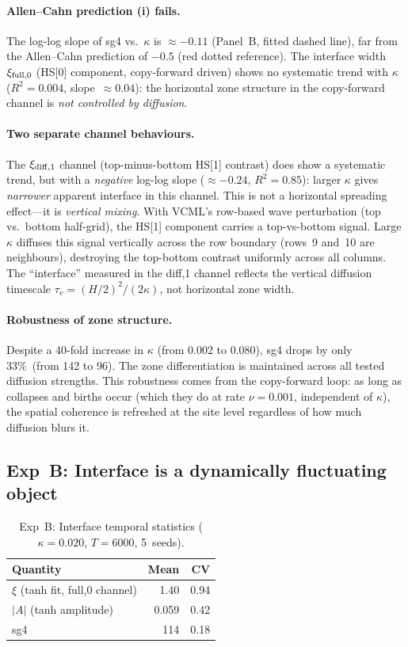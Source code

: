 \documentclass[11pt,a4paper]{article}
\begin{document}
\paragraph{Allen--Cahn prediction (i) fails.}
The log-log slope of sg4 vs.\ $\kappa$ is $\approx -0.11$ (Panel~B, fitted
dashed line), far from the Allen--Cahn prediction of $-0.5$ (red dotted reference).
The interface width $\xi_{\rm full,0}$ (HS[0] component, copy-forward driven)
shows no systematic trend with $\kappa$ ($R^2=0.004$, slope~$\approx 0.04$):
the horizontal zone structure in the copy-forward channel is \emph{not
controlled by diffusion}.

\paragraph{Two separate channel behaviours.}
The $\xi_{\rm diff,1}$ channel (top-minus-bottom HS[1] contrast) does
show a systematic trend, but with a \emph{negative} log-log slope
($\approx -0.24$, $R^2=0.85$): larger $\kappa$ gives \emph{narrower}
apparent interface in this channel.
This is not a horizontal spreading effect---it is \emph{vertical mixing}.
With VCML's row-based wave perturbation (top vs.\ bottom half-grid), the HS[1]
component carries a top-vs-bottom signal.  Large $\kappa$ diffuses this
signal vertically across the row boundary (rows~9 and~10 are neighbours),
destroying the top-bottom contrast uniformly across all columns.
The ``interface'' measured in the diff,1 channel reflects the vertical
diffusion timescale $\tau_v=(H/2)^2/(2\kappa)$, not horizontal zone width.

\paragraph{Robustness of zone structure.}
Despite a 40-fold increase in $\kappa$ (from 0.002 to 0.080), sg4 drops
by only 33\%\ (from 142 to 96). The zone differentiation is maintained
across all tested diffusion strengths.  This robustness comes from the
copy-forward loop: as long as collapses and births occur (which they do
at rate $\nu=0.001$, independent of $\kappa$), the spatial coherence is
refreshed at the site level regardless of how much diffusion blurs it.

\subsection{Exp~B: Interface is a dynamically fluctuating object}

\begin{table}[h]
\centering
\small
\caption{Exp~B: Interface temporal statistics ($\kappa=0.020$, $T=6000$, 5~seeds).}
\label{tab:expb}
\begin{tabular}{lrr}
\toprule
Quantity & Mean & CV \\
\midrule
$\xi$ (tanh fit, full,0 channel) & 1.40 & 0.94 \\
$|A|$ (tanh amplitude)           & 0.059 & 0.42 \\
sg4                              & 114 & 0.18 \\
\bottomrule
\end{tabular}
\end{table}
\end{document}
